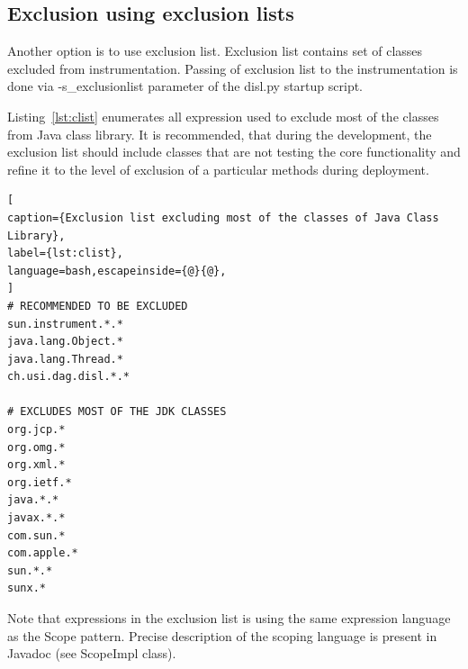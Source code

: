 \documentclass{article}
\newcommand{\brcode}[1]{\textsf{#1}}
\newcommand{\code}[1]{\mbox{\brcode{#1}}}
\begin{document}
\subsection{Exclusion using exclusion lists}


Another option is to use exclusion list.
Exclusion list contains set of classes excluded from instrumentation.
Passing of exclusion list to the instrumentation is done via \code{-s\_exclusionlist} parameter of the \code{disl.py} startup script.

Listing~\ref{lst:clist} enumerates all expression used to exclude most of the classes from Java class library.
It is recommended, that during the development, the exclusion list should include classes that are not testing the core functionality and refine it to the level of exclusion of a particular methods during deployment.

\begin{lstlisting}[
caption={Exclusion list excluding most of the classes of Java Class Library},
label={lst:clist},
language=bash,escapeinside={@}{@},
]
# RECOMMENDED TO BE EXCLUDED
sun.instrument.*.*
java.lang.Object.*
java.lang.Thread.*
ch.usi.dag.disl.*.*

# EXCLUDES MOST OF THE JDK CLASSES
org.jcp.*
org.omg.*
org.xml.*
org.ietf.*
java.*.*
javax.*.*
com.sun.*
com.apple.*
sun.*.*
sunx.*
\end{lstlisting}

Note that expressions in the exclusion list is using the same expression language as the Scope pattern.
Precise description of the scoping language is present in Javadoc (see ScopeImpl class).
\end{document}
